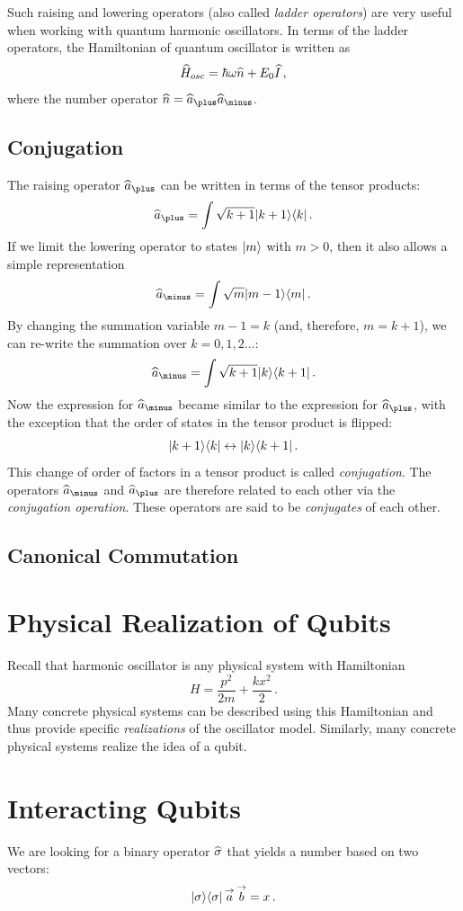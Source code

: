 Such raising and lowering operators (also called \emph{ladder operators}) are very useful when working with quantum harmonic oscillators. In terms of the ladder operators, the Hamiltonian of quantum oscillator is written as
\[
\widehat{H}_{osc} = \hbar\omega\widehat{n}+E_0\widehat{I}\,,
\]
where the number operator $\op{n}=\op{a}_\plus\op{a}_\minus$. 


\subsection{Conjugation}
The raising operator $\op{a}_\plus$ can be written in terms of the tensor products:
\[
\op{a}_\plus=\int \sqrt{k+1}\ketbra{k+1}{k}\,.
\]
If we limit the lowering operator to states $|{m}\rangle$ with $m>0$, then it also allows a simple representation
\[
\op{a}_\minus=\int \sqrt{m}\ketbra{m-1}{m}\,.
\]
By changing the summation variable $m-1=k$ (and, therefore, $m=k+1$), we can re-write the summation over $k=0,1,2\ldots$:
\[
\op{a}_\minus=\int \sqrt{k+1}\ketbra{k}{k+1}\,.
\]
Now the expression for $\op{a}_\minus$ became similar to the expression for $\op{a}_\plus$, with the exception that the order of states in the tensor product is flipped:
\[
|{k+1}\rangle\langle{k}|\leftrightarrow |{k}\rangle\langle{k+1}|\,.
\]
This change of order of factors in a tensor product is called \emph{conjugation}. The operators $\op{a}_\minus$ and $\op{a}_\plus$ are therefore related to each other via the \emph{conjugation operation}. These operators are said to be \emph{conjugates} of each other. 

\subsection{Canonical Commutation}


\section{Physical Realization of Qubits}
Recall that harmonic oscillator is any physical system with Hamiltonian
\[
H = \frac{p^2}{2m}+\frac{kx^2}{2}\,.
\] 
Many concrete physical systems can be described using this Hamiltonian and thus provide specific \emph{realizations} of 
the oscillator model. Similarly, many concrete physical systems realize the idea of a qubit.

\section{Interacting Qubits}\label{sec:InteractingQubits}
We are looking for a binary operator $\widehat{\sigma}$ that yields a number
based on two vectors:
\[
|{\sigma}\rangle\langle{\sigma}|\,\overset{\rightarrow}{a}\,\overset{\rightarrow}{b}=x\,.
\]
